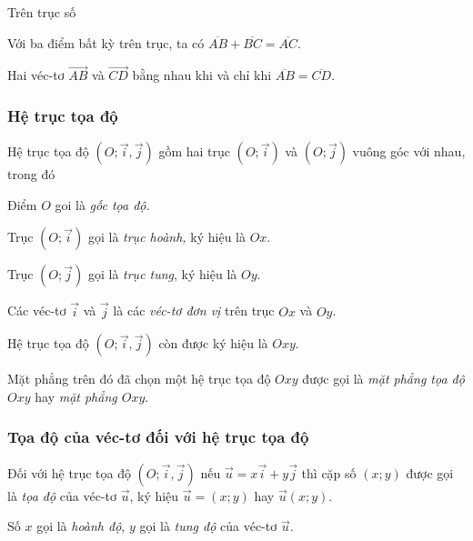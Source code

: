 \begin{dl}
	Trên trục số
	
	Với ba điểm bất kỳ trên trục, ta có $\overline{AB} + \overline{BC}= \overline{AC}.$
	
	Hai véc-tơ $\overrightarrow{AB}$ và $\overrightarrow{CD}$ bằng nhau khi và chỉ khi $\overline{AB}=\overline{CD}.$
\end{dl}

\subsubsection*{Hệ trục tọa độ}
Hệ trục tọa độ $(O; \overrightarrow{i}, \overrightarrow{j})$ gồm hai trục $(O; \overrightarrow{i})$ và $(O; \overrightarrow{j})$ vuông góc với nhau, trong đó

Điểm $O$ goi là \textit{gốc tọa độ.}

Trục $(O; \overrightarrow{i})$ gọi là \textit{trục hoành,} ký hiệu là $Ox$.

Trục $(O; \overrightarrow{j})$ gọi là \textit{ trục tung}, ký hiệu là $Oy$.

Các véc-tơ $\overrightarrow{i}$ và $\overrightarrow{j}$ là các \textit{véc-tơ đơn vị} trên trục $Ox$ và $Oy$.

Hệ trục tọa độ $(O; \overrightarrow{i}, \overrightarrow{j})$ còn được ký hiệu là $Oxy$.

\begin{note}
	Mặt phẳng trên đó đã chọn một hệ trục tọa độ $Oxy$ được gọi là \textit{mặt phẳng tọa độ $Oxy$} hay \textit{mặt phẳng $Oxy$}.
\end{note}

\subsubsection*{Tọa độ của véc-tơ đối với hệ trục tọa độ}
Đối với hệ trục tọa độ $(O;\overrightarrow{i}, \overrightarrow{j})$ nếu $\overrightarrow{u} = x \overrightarrow{i} + y \overrightarrow{j}$ thì cặp số $(x;y)$ được gọi là \textit{tọa độ} của véc-tơ $\overrightarrow{u}$, ký hiệu $\overrightarrow{u}=(x;y)$ hay $\overrightarrow{u}(x;y).$

Số $x$ gọi là \textit{hoành độ}, $y$ gọi là \textit{tung độ} của véc-tơ $\overrightarrow{u}$.

